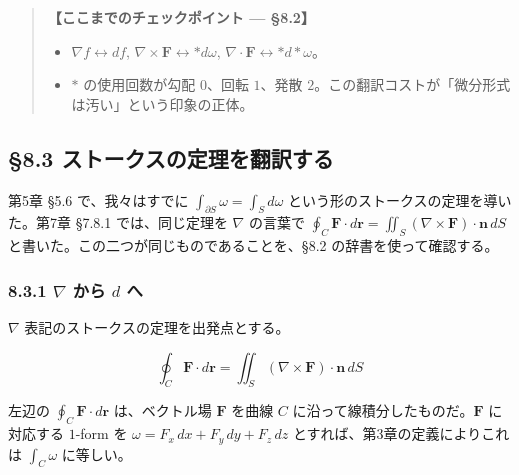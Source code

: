 \documentclass[a4paper,12pt,openany]{book}
\begin{document}
\begin{quote}
\textbf{【ここまでのチェックポイント — §8.2】}

\begin{itemize}
\item
  \(\nabla f \leftrightarrow df\),
  \(\nabla\times\mathbf{F} \leftrightarrow \ast d\omega\),
  \(\nabla\cdot\mathbf{F} \leftrightarrow \ast d\ast\omega\)。
\item
  \(\ast\) の使用回数が勾配 \(0\)、回転 \(1\)、発散
  \(2\)。この翻訳コストが「微分形式は汚い」という印象の正体。
\end{itemize}
\end{quote}

\par\vspace{0.35em}\par

\hypertarget{ux30b9ux30c8ux30fcux30afux30b9ux306eux5b9aux7406ux3092ux7ffbux8a33ux3059ux308b}{%
\subsection{§8.3
ストークスの定理を翻訳する}\label{ux30b9ux30c8ux30fcux30afux30b9ux306eux5b9aux7406ux3092ux7ffbux8a33ux3059ux308b}}

第5章 §5.6 で、我々はすでに \(\int_{\partial S}\omega = \int_S d\omega\)
という形のストークスの定理を導いた。第7章 §7.8.1 では、同じ定理を
\(\nabla\) の言葉で
\(\oint_C \mathbf{F}\cdot d\mathbf{r} = \iint_S (\nabla\times\mathbf{F})\cdot\mathbf{n}\,dS\)
と書いた。この二つが同じものであることを、§8.2 の辞書を使って確認する。

\hypertarget{nabla-ux304bux3089-d-ux3078}{%
\subsubsection{\texorpdfstring{8.3.1 \(\nabla\) から \(d\)
へ}{8.3.1 \textbackslash nabla から d へ}}\label{nabla-ux304bux3089-d-ux3078}}

\(\nabla\) 表記のストークスの定理を出発点とする。

\[\oint_C \mathbf{F} \cdot d\mathbf{r} = \iint_S (\nabla \times \mathbf{F}) \cdot \mathbf{n}\,dS\]

左辺の \(\oint_C \mathbf{F}\cdot d\mathbf{r}\) は、ベクトル場
\(\mathbf{F}\) を曲線 \(C\) に沿って線積分したものだ。\(\mathbf{F}\)
に対応する \(1\)-form を \(\omega = F_x\,dx + F_y\,dy + F_z\,dz\)
とすれば、第3章の定義によりこれは \(\int_C \omega\) に等しい。
\end{document}
